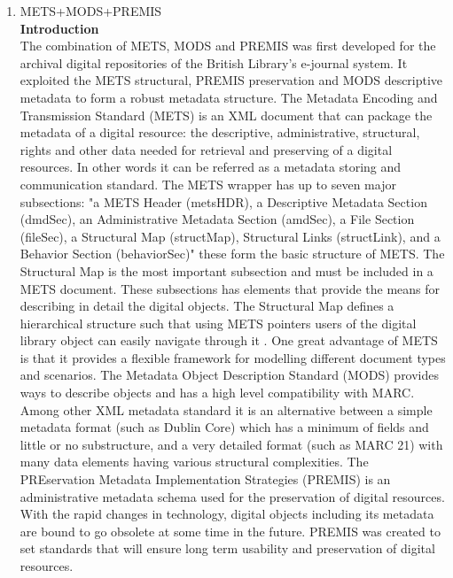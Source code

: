 \begin{enumerate}
	\item METS+MODS+PREMIS\\
	{\bf Introduction}\\
	The combination of METS, MODS and PREMIS was first developed for the archival digital repositories of the British Library's e-journal system.\cite{Dappert2008} It exploited the METS structural, PREMIS preservation and MODS descriptive metadata to form a robust metadata structure. 
	The Metadata Encoding and Transmission Standard (METS) is an XML document that can package the metadata of a digital resource: the descriptive, administrative, structural, rights and other data needed for retrieval and preserving of a digital resources.\cite{Guenther200312} In other words it can be referred as a metadata storing and communication standard. The METS wrapper has up to seven major subsections: "a METS Header (metsHDR), a Descriptive Metadata Section (dmdSec), an Administrative Metadata Section (amdSec), a File Section (fileSec), a Structural Map (structMap), Structural Links (structLink), and a Behavior Section (behaviorSec)" these form the basic structure of METS. The Structural Map is the most important subsection and must be included in a METS document.\cite{Cheslow2014} These subsections has elements that provide the means for describing in detail the digital objects. The Structural Map defines a hierarchical structure such that using METS pointers users of the digital library object can easily navigate through it . One great advantage of METS is that it provides a flexible framework for modelling different document types and scenarios.\cite{Dappert2008}
	The Metadata Object Description Standard (MODS) provides ways to describe objects and has a high level compatibility with MARC. Among other XML metadata standard it is an alternative between a simple metadata format (such as Dublin Core) which has a minimum of fields and little or no substructure, and a very detailed format (such as MARC 21) with many data elements having various structural complexities.\cite{Guenther200312}
	The PREservation Metadata Implementation Strategies (PREMIS) is an administrative metadata schema used for the preservation of digital resources.\cite{Cheslow2014} With the rapid changes in technology, digital objects including its metadata are bound to go obsolete at some time in the future. PREMIS was created to set standards that will ensure long term usability and preservation of digital resources.
	

\end{enumerate}
